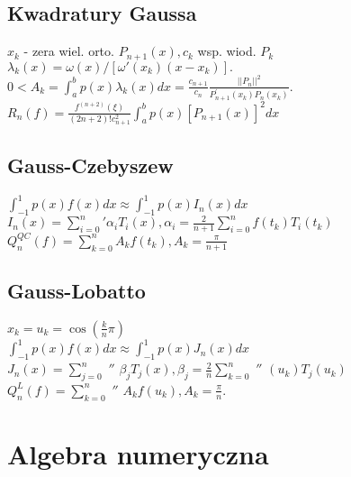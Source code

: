 \documentclass[a4paper,twocolumn]{article}
\begin{document}
\subsection{Kwadratury Gaussa}
\noindent$x_k$ - zera wiel. orto. $P_{n+1}(x), c_k $ wsp. wiod. $P_k$\\
$\lambda_k(x) = \omega(x) / [\omega'(x_k)(x-x_k)]. $ \\
$0 < A_k=\int_{a}^{b}p(x)\lambda_k(x) dx = \frac{c_{n+1}}{c_n} \frac{||P_n||^2}{P_{n+1}^{'}(x_k)P_n(x_k)}$.  \\
$R_n(f)=\frac{f^{(n+2)}(\xi)}{(2n+2)!c_{n+1}^{2} }\int_a^bp(x)[P_{n+1}(x)]^2 dx $
\subsection{Gauss-Czebyszew}
\noindent
$\int_{-1}^1p(x)f(x)dx \approx \int_{-1}^1p(x)I_n(x)dx$ \\
$ I_n(x)=\sum_{i=0}^{n}  \prime \alpha_iT_i(x), \alpha_i=\frac{2}{n+1}\sum_{i=0}^nf(t_k)T_i(t_k)$\\
$Q_n^{QC}(f)=\sum_{k=0}^{n}A_kf(t_k), A_k=\frac{\pi}{n+1}$
\subsection{Gauss-Lobatto}
\noindent
$x_k=u_k=\cos\left(\frac{k}{n}\pi\right)$ \\
$\int_{-1}^1p(x)f(x)dx \approx \int_{-1}^1p(x)J_n(x)dx$ \\
$ J_n(x)=\sum_{j=0}^{n}  $ $''$ $ \beta_jT_j(x), \beta_j=\frac{2}{n}\sum_{k=0}^n $ $''$ $  (u_k)T_j(u_k)$\\
$Q_n^{L}(f)=\sum_{k=0}^{n} $ $''$ $ A_kf(u_k), A_k=\frac{\pi}{n}.$



\section{Algebra numeryczna}
\end{document}
